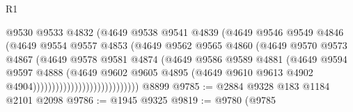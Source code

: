 \begin{lexlean}{R1}
\begin{coremodule}
                                        @9530
                                        @9533
                                        @4832
                                        (@4649
                                          @9538
                                          @9541
                                          @4839
                                          (@4649
                                            @9546
                                            @9549
                                            @4846
                                            (@4649
                                              @9554
                                              @9557
                                              @4853
                                              (@4649
                                                @9562
                                                @9565
                                                @4860
                                                (@4649
                                                  @9570
                                                  @9573
                                                  @4867
                                                  (@4649
                                                    @9578
                                                    @9581
                                                    @4874
                                                    (@4649
                                                      @9586
                                                      @9589
                                                      @4881
                                                      (@4649
                                                        @9594
                                                        @9597
                                                        @4888
                                                        (@4649
                                                          @9602
                                                          @9605
                                                          @4895
                                                          (@4649
                                                            @9610
                                                            @9613
                                                            @4902
                                                            @4904))))))))))))))))))))))))))))
    @8899
@9785 := @2884 @9328 @183 @1184 @2101 @2098
@9786 := @1945 @9325
@9819 := @9780
    (@9785

\end{coremodule}
\end{lexlean}
